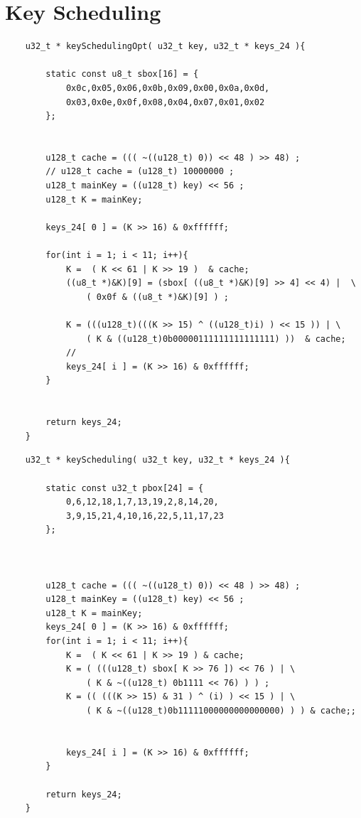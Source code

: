 \documentclass{report}
\begin{document}
\section{ Key Scheduling } 


\begin{lstlisting}
    u32_t * keySchedulingOpt( u32_t key, u32_t * keys_24 ){

        static const u8_t sbox[16] = {
            0x0c,0x05,0x06,0x0b,0x09,0x00,0x0a,0x0d,
            0x03,0x0e,0x0f,0x08,0x04,0x07,0x01,0x02
        };
    
        
        u128_t cache = ((( ~((u128_t) 0)) << 48 ) >> 48) ;
        // u128_t cache = (u128_t) 10000000 ;
        u128_t mainKey = ((u128_t) key) << 56 ;
        u128_t K = mainKey;
    
        keys_24[ 0 ] = (K >> 16) & 0xffffff;
        
        for(int i = 1; i < 11; i++){
            K =  ( K << 61 | K >> 19 )  & cache;
            ((u8_t *)&K)[9] = (sbox[ ((u8_t *)&K)[9] >> 4] << 4) |  \
                ( 0x0f & ((u8_t *)&K)[9] ) ; 

            K = (((u128_t)(((K >> 15) ^ ((u128_t)i) ) << 15 )) | \
                ( K & ((u128_t)0b00000111111111111111) ))  & cache;
            //
            keys_24[ i ] = (K >> 16) & 0xffffff;
        }
    
    
        return keys_24;
    }
\end{lstlisting}
\newpage
\begin{lstlisting}
    u32_t * keyScheduling( u32_t key, u32_t * keys_24 ){

        static const u32_t pbox[24] = {
            0,6,12,18,1,7,13,19,2,8,14,20,
            3,9,15,21,4,10,16,22,5,11,17,23
        };

    
    
        u128_t cache = ((( ~((u128_t) 0)) << 48 ) >> 48) ;
        u128_t mainKey = ((u128_t) key) << 56 ;
        u128_t K = mainKey;
        keys_24[ 0 ] = (K >> 16) & 0xffffff;
        for(int i = 1; i < 11; i++){
            K =  ( K << 61 | K >> 19 ) & cache;
            K = ( (((u128_t) sbox[ K >> 76 ]) << 76 ) | \ 
                ( K & ~((u128_t) 0b1111 << 76) ) ) ;
            K = (( (((K >> 15) & 31 ) ^ (i) ) << 15 ) | \ 
                ( K & ~((u128_t)0b11111000000000000000) ) ) & cache;;
    
       
            keys_24[ i ] = (K >> 16) & 0xffffff;
        }
    
        return keys_24;
    }
\end{lstlisting}
\end{document}
